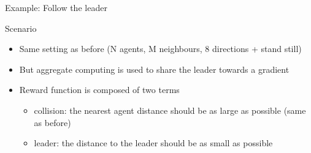 \documentclass[presentation, 8pt]{beamer}\mode<presentation>{\usetheme{AMSBolognaFC}}
\begin{document}
\begin{frame}{Example: Follow the leader}
\begin{exampleblock}{Scenario}
	\begin{itemize}
		\item Same setting as before (N agents, M neighbours, 8 directions + stand still)
		\item But aggregate computing is used to share the leader towards a gradient
		\item Reward function is composed of two terms
		\begin{itemize}
			\item collision: the nearest agent distance should be as large as possible (same as before)
			\item leader: the distance to the leader should be as small as possible
		\end{itemize}
	\end{itemize}

\end{exampleblock}
\end{frame}
\end{document}
